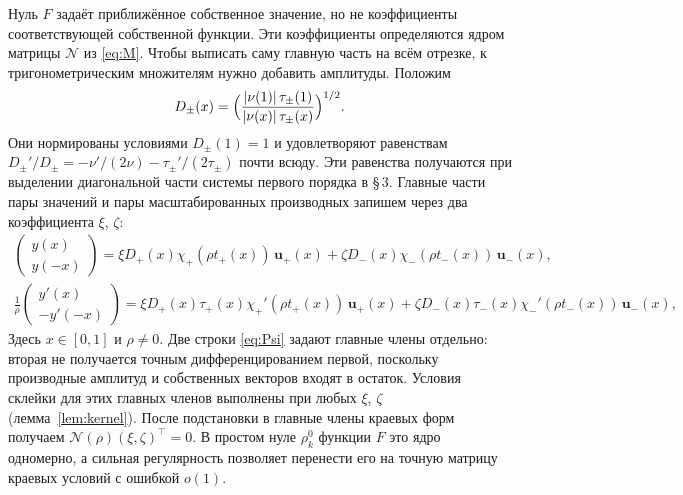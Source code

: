 \documentclass[12pt,a4paper]{article}
\numberwithin{equation}{section}
\theoremstyle{definition}
\newcommand{\abs}[1]{\lvert#1\rvert}
\newcommand{\Mm}{\mathcal N}
\begin{document}
Нуль $F$ задаёт приближённое собственное значение, но не коэффициенты соответствующей
собственной функции. Эти коэффициенты определяются ядром матрицы $\Mm$ из
\eqref{eq:M}. Чтобы выписать саму главную часть на всём отрезке, к
тригонометрическим множителям нужно добавить амплитуды. Положим
\[
 D_\pm(x)=\Bigl(\frac{\abs{\nu(1)}\,\tau_\pm(1)}{\abs{\nu(x)}\,\tau_\pm(x)}\Bigr)^{1/2}.
\]
Они нормированы условиями $D_\pm(1)=1$ и удовлетворяют равенствам
$D_\pm'/D_\pm=-\nu'/(2\nu)-\tau_\pm'/(2\tau_\pm)$ почти всюду. Эти равенства
получаются при выделении диагональной части системы первого порядка в \S\,3.
Главные части пары значений и пары масштабированных производных запишем через
два коэффициента $\xi$, $\zeta$:
\begin{equation}\label{eq:Psi}
\begin{gathered}
 \begin{pmatrix}y(x)\\ y(-x)\end{pmatrix}
 =\xi D_+(x)\chi_+(\rho t_+(x))\,\mathbf u_+(x)
 +\zeta D_-(x)\chi_-(\rho t_-(x))\,\mathbf u_-(x),\\
 \frac1\rho\begin{pmatrix}y'(x)\\ -y'(-x)\end{pmatrix}
 =\xi D_+(x)\tau_+(x)\chi_+'(\rho t_+(x))\,\mathbf u_+(x)
 +\zeta D_-(x)\tau_-(x)\chi_-'(\rho t_-(x))\,\mathbf u_-(x),
\end{gathered}
\end{equation}
Здесь $x\in[0,1]$ и $\rho\ne0$. Две строки \eqref{eq:Psi} задают главные
члены отдельно: вторая не получается точным дифференцированием первой, поскольку
производные амплитуд и собственных векторов входят в остаток. Условия склейки
для этих главных членов выполнены при любых $\xi$, $\zeta$
(лемма~\ref{lem:kernel}). После подстановки в главные члены краевых форм получаем
$\Mm(\rho)(\xi,\zeta)^\top=0$. В простом нуле $\rho_k^0$ функции $F$ это ядро
одномерно, а сильная регулярность позволяет перенести его на точную матрицу
краевых условий с ошибкой $o(1)$.
\end{document}
